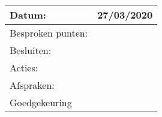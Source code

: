 \begin{tabularx}{\textwidth}{| l | X |}
  \hline
  Datum: & 27/03/2020\\
  \hline
  Besproken punten: & \\
  \hline
  Besluiten: & \\
  Acties: & \\
  Afspraken: & \\
  \hline
  Goedgekeuring & \\
  \hline
\end{tabularx}